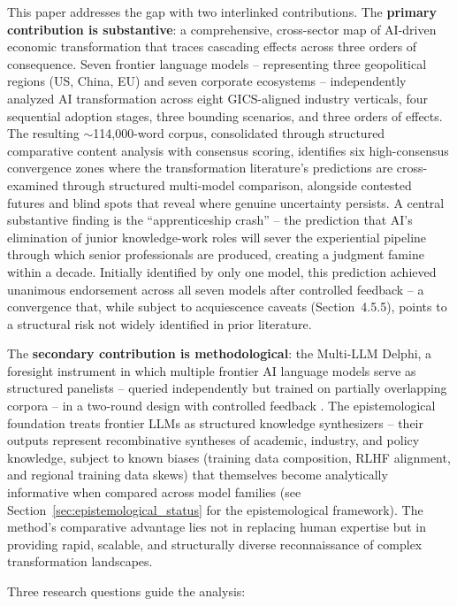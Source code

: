 \documentclass[preprint,review,12pt]{elsarticle}
\begin{document}
This paper addresses the gap with two interlinked contributions. The \textbf{primary contribution is substantive}: a comprehensive, cross-sector map of AI-driven economic transformation that traces cascading effects across three orders of consequence. Seven frontier language models -- representing three geopolitical regions (US, China, EU) and seven corporate ecosystems -- independently analyzed AI transformation across eight GICS-aligned industry verticals, four sequential adoption stages, three bounding scenarios, and three orders of effects. The resulting ${\sim}$114,000-word corpus, consolidated through structured comparative content analysis with consensus scoring, identifies six high-consensus convergence zones where the transformation literature's predictions are cross-examined through structured multi-model comparison, alongside contested futures and blind spots that reveal where genuine uncertainty persists. A central substantive finding is the ``apprenticeship crash'' -- the prediction that AI's elimination of junior knowledge-work roles will sever the experiential pipeline through which senior professionals are produced, creating a judgment famine within a decade. Initially identified by only one model, this prediction achieved unanimous endorsement across all seven models after controlled feedback -- a convergence that, while subject to acquiescence caveats (Section~4.5.5), points to a structural risk not widely identified in prior literature.

The \textbf{secondary contribution is methodological}: the Multi-LLM Delphi, a foresight instrument in which multiple frontier AI language models serve as structured panelists -- queried independently but trained on partially overlapping corpora -- in a two-round design with controlled feedback \citep{linstone1975delphi, gordon2006rtdelphi}. The epistemological foundation treats frontier LLMs as structured knowledge synthesizers -- their outputs represent recombinative syntheses of academic, industry, and policy knowledge, subject to known biases (training data composition, RLHF alignment, and regional training data skews) that themselves become analytically informative when compared across model families (see Section~\ref{sec:epistemological_status} for the epistemological framework). The method's comparative advantage lies not in replacing human expertise but in providing rapid, scalable, and structurally diverse reconnaissance of complex transformation landscapes.

Three research questions guide the analysis:
\end{document}
